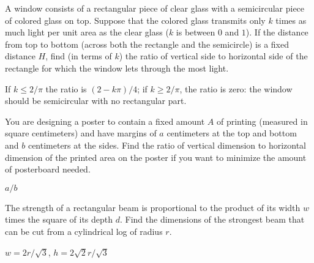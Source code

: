 \begin{exercises}
\begin{exercise} A window consists of a rectangular piece of clear glass with
a semicircular piece of colored glass on top.  Suppose that the
colored glass transmits only $k$ times as much light per unit area as
the clear glass ($k$ is between $0$ and $1$).  If the distance from
top to bottom (across both the rectangle and the semicircle) is a
fixed distance $H$,
find (in terms of $k$) the ratio of vertical side to horizontal side
of the rectangle for which the window lets through the most light.
\begin{answer} If $k\le 2/\pi$ the ratio is $(2-k\pi)/4$; if $k\ge 2/\pi$,
the ratio is zero: the window should be semicircular with no
rectangular part.
\end{answer}\end{exercise}

\begin{exercise} You are designing a poster to contain a fixed amount $A$ of
printing (measured in square centimeters) and have margins of $a$
centimeters at the top and bottom and $b$ centimeters at the sides.
Find the ratio of vertical dimension to horizontal dimension of the
printed area on the poster if you want to minimize the amount of
posterboard needed.
\begin{answer} $a/b$
\end{answer}\end{exercise}

\begin{exercise}
The strength of a rectangular beam is proportional to the product of its
width $w$ times the square of its depth $d$.  
Find the dimensions of the strongest
beam that can be cut from a cylindrical log of radius $r$.
\begin{answer} $w=2r/\sqrt3$, $h=2\sqrt2r/\sqrt3$
\end{answer}\end{exercise}





\end{exercises}
